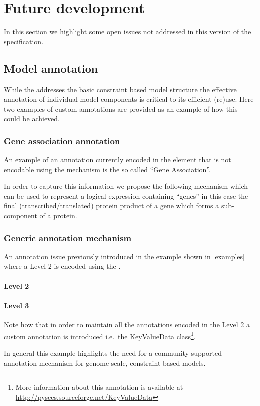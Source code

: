 
\section{Future development}
\label{future}

In this section we highlight some open issues not addressed in this version
of the \FBC specification.

\subsection{Model annotation}
While the \FBCPackage addresses the basic constraint based model structure the
effective annotation of individual model components is critical to its
efficient (re)use. Here two examples of custom annotations are provided as
an example of how this could be achieved.

\subsubsection{Gene association annotation}
An example of an annotation currently encoded in the \Notes element that is
not encodable using the \SBML \Annotation mechanism is the so called ``Gene
Association''.

In order to capture this information we propose the following mechanism
which can be used to represent a logical expression containing ``genes'' in
this case the final (transcribed/translated) protein product of a gene which
forms a sub-component of a protein.
%

\subsubsection{Generic annotation mechanism}
An annotation issue previously introduced in the example shown in
\ref{examples} where a \SBML Level 2 \Reaction is encoded using the
\FBCPackage.

\paragraph{\SBML Level 2 \Reaction}
%

\paragraph{\SBML Level 3 \Reaction}
Note how that in order to maintain all the annotations encoded in the \SBML
Level 2 \Reaction {} a custom annotation is introduced i.e.~the
\textsf{KeyValueData} class\footnote{More information about this annotation
is available at \url{http://pysces.sourceforge.net/KeyValueData}}.

In general this example highlights the need for a community supported
annotation mechanism for genome scale, constraint based models.
%
